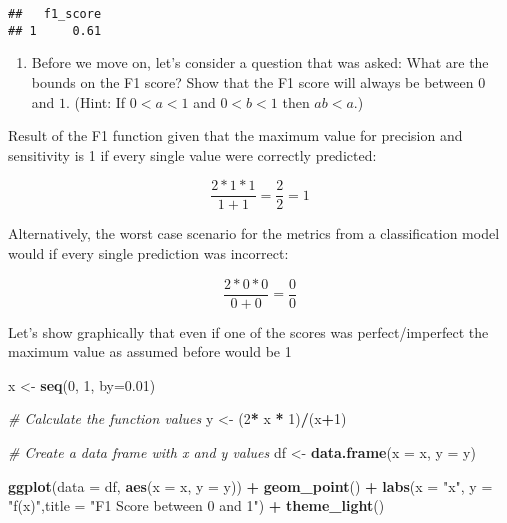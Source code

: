 \documentclass[
]{article}
\newenvironment{Shaded}{\begin{snugshade}}{\end{snugshade}}
\newcommand{\AttributeTok}[1]{\textcolor[rgb]{0.13,0.29,0.53}{#1}}
\newcommand{\CommentTok}[1]{\textcolor[rgb]{0.56,0.35,0.01}{\textit{#1}}}
\newcommand{\DecValTok}[1]{\textcolor[rgb]{0.00,0.00,0.81}{#1}}
\newcommand{\FloatTok}[1]{\textcolor[rgb]{0.00,0.00,0.81}{#1}}
\newcommand{\FunctionTok}[1]{\textcolor[rgb]{0.13,0.29,0.53}{\textbf{#1}}}
\newcommand{\NormalTok}[1]{#1}
\newcommand{\OtherTok}[1]{\textcolor[rgb]{0.56,0.35,0.01}{#1}}
\newcommand{\SpecialCharTok}[1]{\textcolor[rgb]{0.81,0.36,0.00}{\textbf{#1}}}
\newcommand{\StringTok}[1]{\textcolor[rgb]{0.31,0.60,0.02}{#1}}
\providecommand{\tightlist}{%
  \setlength{\itemsep}{0pt}\setlength{\parskip}{0pt}}
\begin{document}
\begin{verbatim}
##   f1_score
## 1     0.61
\end{verbatim}

\begin{enumerate}
\def\labelenumi{\arabic{enumi}.}
\setcounter{enumi}{8}
\tightlist
\item
  Before we move on, let's consider a question that was asked: What are
  the bounds on the F1 score? Show that the F1 score will always be
  between \(0\) and \(1\). (Hint: If \(0 < a < 1\) and \(0 < b < 1\)
  then \(ab < a\).)
\end{enumerate}

Result of the F1 function given that the maximum value for precision and
sensitivity is 1 if every single value were correctly predicted:

\[\frac{2 * 1 * 1}{1+1} = \frac{2}{2} = 1\]

Alternatively, the worst case scenario for the metrics from a
classification model would if every single prediction was incorrect:

\[\frac{2 * 0 * 0}{0+0} = \frac{0}{0}\]

Let's show graphically that even if one of the scores was
perfect/imperfect the maximum value as assumed before would be 1

\begin{Shaded}
\begin{Highlighting}[]
\NormalTok{x }\OtherTok{\textless{}{-}} \FunctionTok{seq}\NormalTok{(}\DecValTok{0}\NormalTok{, }\DecValTok{1}\NormalTok{, }\AttributeTok{by=}\FloatTok{0.01}\NormalTok{)}

\CommentTok{\# Calculate the function values}
\NormalTok{y }\OtherTok{\textless{}{-}}\NormalTok{ (}\DecValTok{2}\SpecialCharTok{*}\NormalTok{ x }\SpecialCharTok{*} \DecValTok{1}\NormalTok{)}\SpecialCharTok{/}\NormalTok{(x}\SpecialCharTok{+}\DecValTok{1}\NormalTok{)}

\CommentTok{\# Create a data frame with x and y values}
\NormalTok{df }\OtherTok{\textless{}{-}} \FunctionTok{data.frame}\NormalTok{(}\AttributeTok{x =}\NormalTok{ x, }\AttributeTok{y =}\NormalTok{ y)}

\FunctionTok{ggplot}\NormalTok{(}\AttributeTok{data =}\NormalTok{ df, }\FunctionTok{aes}\NormalTok{(}\AttributeTok{x =}\NormalTok{ x, }\AttributeTok{y =}\NormalTok{ y)) }\SpecialCharTok{+}
  \FunctionTok{geom\_point}\NormalTok{() }\SpecialCharTok{+}
  \FunctionTok{labs}\NormalTok{(}\AttributeTok{x =} \StringTok{"x"}\NormalTok{, }\AttributeTok{y =} \StringTok{"f(x)"}\NormalTok{,}\AttributeTok{title =} \StringTok{"F1 Score between 0 and 1"}\NormalTok{) }\SpecialCharTok{+}
  \FunctionTok{theme\_light}\NormalTok{()}
\end{Highlighting}
\end{Shaded}
\end{document}
